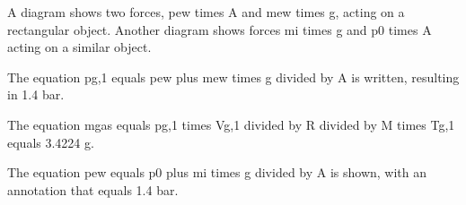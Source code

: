 A diagram shows two forces, pew times A and mew times g, acting on a rectangular object. Another diagram shows forces mi times g and p0 times A acting on a similar object.

The equation pg,1 equals pew plus mew times g divided by A is written, resulting in 1.4 bar.

The equation mgas equals pg,1 times Vg,1 divided by R divided by M times Tg,1 equals 3.4224 g.

The equation pew equals p0 plus mi times g divided by A is shown, with an annotation that equals 1.4 bar.
